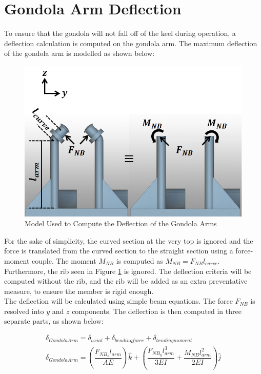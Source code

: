 \documentclass[../main.tex]{subfiles}
\begin{document}
\section{Gondola Arm Deflection} \label{gondDeflection}
To ensure that the gondola will not fall off of the keel during operation, a deflection calculation is computed on the gondola arm. The maximum deflection of the gondola arm is modelled as shown below:

\begin{figure}[H]
	\centering
	\includegraphics[width=.8\linewidth]{img/gondola/armDeflection.PNG}
	\caption{Model Used to Compute the Deflection of the Gondola Arms}
	\label{fig:deflection}
\end{figure}

For the sake of simplicity, the curved section at the very top is ignored and the force is translated from the curved section to the straight section using a force-moment couple. The moment $M_{NB}$ is computed as $M_{NB}=F_{NB}l_{curve}$. Furthermore, the rib seen in Figure \ref{fig:deflection} is ignored. The deflection criteria will be computed without the rib, and the rib will be added as an extra preventative measure, to ensure the member is rigid enough.\\

The deflection will be calculated using simple beam equations. The force $F_{NB}$ is resolved into $y$ and $z$ components. The deflection is then computed in three separate parts, as shown below:

\begin{align}
	\delta _{Gondola Arm} = \delta _{axial} + \delta _{bending force} + \delta _{bending moment} \\ \label{armDeflection}
	\delta _{Gondola Arm}  = \left(\dfrac{F_{NB_{z}}l_{arm}}{AE}\right)\hat{k} + \left(\dfrac{F_{NB_{y}}l_{arm}^3}{3EI}  + \dfrac{M_{NB}l_{arm}^2}{2EI} \right) \hat{j}
\end{align}
\end{document}
